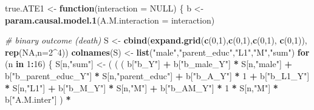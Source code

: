 \documentclass[
]{book}
\newenvironment{Shaded}{\begin{snugshade}}{\end{snugshade}}
\newcommand{\AttributeTok}[1]{\textcolor[rgb]{0.13,0.29,0.53}{#1}}
\newcommand{\CommentTok}[1]{\textcolor[rgb]{0.56,0.35,0.01}{\textit{#1}}}
\newcommand{\ConstantTok}[1]{\textcolor[rgb]{0.56,0.35,0.01}{#1}}
\newcommand{\ControlFlowTok}[1]{\textcolor[rgb]{0.13,0.29,0.53}{\textbf{#1}}}
\newcommand{\DecValTok}[1]{\textcolor[rgb]{0.00,0.00,0.81}{#1}}
\newcommand{\FunctionTok}[1]{\textcolor[rgb]{0.13,0.29,0.53}{\textbf{#1}}}
\newcommand{\NormalTok}[1]{#1}
\newcommand{\OtherTok}[1]{\textcolor[rgb]{0.56,0.35,0.01}{#1}}
\newcommand{\SpecialCharTok}[1]{\textcolor[rgb]{0.81,0.36,0.00}{\textbf{#1}}}
\newcommand{\StringTok}[1]{\textcolor[rgb]{0.31,0.60,0.02}{#1}}
\begin{document}
\begin{Shaded}
\begin{Highlighting}[]
\NormalTok{true.ATE1 }\OtherTok{\textless{}{-}} \ControlFlowTok{function}\NormalTok{(}\AttributeTok{interaction =} \ConstantTok{NULL}\NormalTok{) \{}
\NormalTok{  b }\OtherTok{\textless{}{-}} \FunctionTok{param.causal.model.1}\NormalTok{(}\AttributeTok{A.M.interaction =}\NormalTok{ interaction)}
  
  \CommentTok{\# binary outcome (death)}
\NormalTok{  S }\OtherTok{\textless{}{-}} \FunctionTok{cbind}\NormalTok{(}\FunctionTok{expand.grid}\NormalTok{(}\FunctionTok{c}\NormalTok{(}\DecValTok{0}\NormalTok{,}\DecValTok{1}\NormalTok{),}\FunctionTok{c}\NormalTok{(}\DecValTok{0}\NormalTok{,}\DecValTok{1}\NormalTok{),}\FunctionTok{c}\NormalTok{(}\DecValTok{0}\NormalTok{,}\DecValTok{1}\NormalTok{), }\FunctionTok{c}\NormalTok{(}\DecValTok{0}\NormalTok{,}\DecValTok{1}\NormalTok{)), }\FunctionTok{rep}\NormalTok{(}\ConstantTok{NA}\NormalTok{,}\AttributeTok{n=}\DecValTok{2}\SpecialCharTok{\^{}}\DecValTok{4}\NormalTok{))}
  \FunctionTok{colnames}\NormalTok{(S) }\OtherTok{\textless{}{-}} \FunctionTok{list}\NormalTok{(}\StringTok{"male"}\NormalTok{,}\StringTok{"parent\_educ"}\NormalTok{,}\StringTok{"L1"}\NormalTok{,}\StringTok{"M"}\NormalTok{,}\StringTok{"sum"}\NormalTok{)}
  \ControlFlowTok{for}\NormalTok{ (n }\ControlFlowTok{in} \DecValTok{1}\SpecialCharTok{:}\DecValTok{16}\NormalTok{) \{}
\NormalTok{    S[n,}\StringTok{"sum"}\NormalTok{] }\OtherTok{\textless{}{-}}\NormalTok{ ( ( ( b[}\StringTok{"b\_Y"}\NormalTok{] }\SpecialCharTok{+} 
\NormalTok{                      b[}\StringTok{"b\_male\_Y"}\NormalTok{] }\SpecialCharTok{*}\NormalTok{ S[n,}\StringTok{"male"}\NormalTok{] }\SpecialCharTok{+} 
\NormalTok{                      b[}\StringTok{"b\_parent\_educ\_Y"}\NormalTok{] }\SpecialCharTok{*}\NormalTok{ S[n,}\StringTok{"parent\_educ"}\NormalTok{] }\SpecialCharTok{+} 
\NormalTok{                      b[}\StringTok{"b\_A\_Y"}\NormalTok{] }\SpecialCharTok{*} \DecValTok{1} \SpecialCharTok{+} 
\NormalTok{                      b[}\StringTok{"b\_L1\_Y"}\NormalTok{] }\SpecialCharTok{*}\NormalTok{ S[n,}\StringTok{"L1"}\NormalTok{] }\SpecialCharTok{+}
\NormalTok{                      b[}\StringTok{"b\_M\_Y"}\NormalTok{] }\SpecialCharTok{*}\NormalTok{ S[n,}\StringTok{"M"}\NormalTok{] }\SpecialCharTok{+}
\NormalTok{                      b[}\StringTok{"b\_AM\_Y"}\NormalTok{] }\SpecialCharTok{*} \DecValTok{1} \SpecialCharTok{*}\NormalTok{ S[n,}\StringTok{"M"}\NormalTok{] }\SpecialCharTok{*}\NormalTok{ b[}\StringTok{"A.M.inter"}\NormalTok{] ) }\SpecialCharTok{*}

\end{Highlighting}
\end{Shaded}
\end{document}
